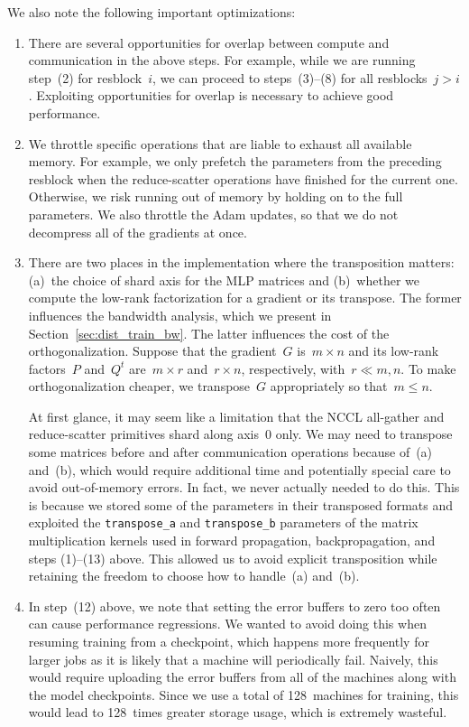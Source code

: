 \documentclass{article}
\begin{document}
We also note the following important optimizations:
\begin{enumerate}
    \item There are several opportunities for overlap between compute and communication in the above steps. For example, while we are running step~(2) for resblock~$i$, we can proceed to steps~(3)--(8) for all resblocks~$j > i$. Exploiting opportunities for overlap is necessary to achieve good performance.
    \item We throttle specific operations that are liable to exhaust all available memory. For example, we only prefetch the parameters from the preceding resblock when the reduce-scatter operations have finished for the current one. Otherwise, we risk running out of memory by holding on to the full parameters. We also throttle the Adam updates, so that we do not decompress all of the gradients at once.
    \item There are two places in the implementation where the transposition matters: (a)~the choice of shard axis for the MLP matrices and (b)~whether we compute the low-rank factorization for a gradient or its transpose. The former influences the bandwidth analysis, which we present in Section~\ref{sec:dist_train_bw}. The latter influences the cost of the orthogonalization. Suppose that the gradient~$G$ is~$m \times n$ and its low-rank factors~$P$ and~$Q^t$ are~$m \times r$ and~$r \times n$, respectively, with~$r \ll m, n$. To make orthogonalization cheaper, we transpose~$G$ appropriately so that~$m \leqslant n$.
    
    At first glance, it may seem like a limitation that the NCCL all-gather and reduce-scatter primitives shard along axis~0 only. We may need to transpose some matrices before and after communication operations because of~(a) and~(b), which would require additional time and potentially special care to avoid out-of-memory errors. In fact, we never actually needed to do this. This is because we stored some of the parameters in their transposed formats and exploited the \texttt{transpose\_a} and \texttt{transpose\_b} parameters of the matrix multiplication kernels used in forward propagation, backpropagation, and steps (1)--(13) above. This allowed us to avoid explicit transposition while retaining the freedom to choose how to handle~(a) and~(b).
    \item In step~(12) above, we note that setting the error buffers to zero too often can cause performance regressions. We wanted to avoid doing this when resuming training from a checkpoint, which happens more frequently for larger jobs as it is likely that a machine will periodically fail. Naively, this would require uploading the error buffers from all of the machines along with the model checkpoints. Since we use a total of 128~machines for training, this would lead to 128~times greater storage usage, which is extremely wasteful.
    

\end{enumerate}
\end{document}
